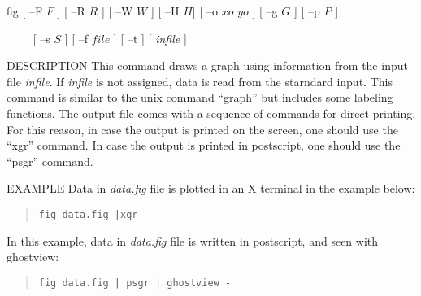 
\begin{synopsis}
 \item[fig] [ --F $F$ ] [ --R $R$ ] [ --W $W$ ] [ --H $H$] [ --o $xo$ $yo$ ]
	    [ --g $G$ ]  [ --p $P$ ] 
 \item[\ ~~~] [ --s $S$ ] [ --f $file$ ] [ --t ] [ {\em infile} ]
\end{synopsis}

\begin{qsection}{DESCRIPTION}
This command draws a graph using information from the input file
{\em infile}. 
If {\em infile} is not assigned, data is read from the starndard input.
This command is similar to the unix command ``graph'' but includes
some labeling functions.
The output file comes with a sequence of commands for direct printing.
For this reason, in case the output is printed on the screen,
one should use the ``xgr'' command.
In case the output is printed in postscript, one should use the
``psgr'' command.
\end{qsection}

\begin{options}
\end{options}

\begin{qsection}{EXAMPLE}
Data in {\em data.fig} file is plotted in an X terminal in the
example below:
\vspace{-3mm}
\begin{quote}
 \verb!fig data.fig |xgr!
\end{quote}
\vspace{-3mm}
In this example, data in {\em data.fig} file is written in postscript,
and seen with ghostview:
\vspace{-3mm}
\begin{quote}
 \verb!fig data.fig | psgr | ghostview -!
\end{quote}
\vspace{-3mm}
\end{qsection}


